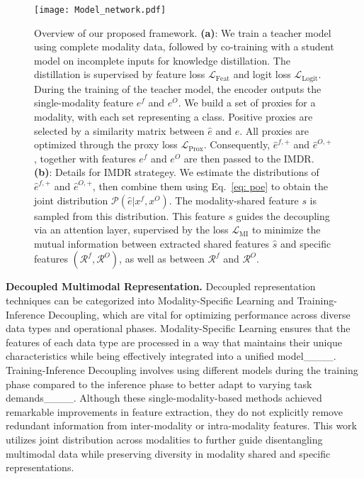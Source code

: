 \begin{figure*}[!ht]
\centering
\normalsize
\texttt{[image: Model\_network.pdf]}
    \caption{Overview of our proposed framework. \textbf{(a)}: 
    We train a teacher model using complete modality data, followed by co-training with a student model on incomplete inputs for knowledge distillation. The distillation is supervised by feature loss $\mathcal{L}_{\text{Feat}}$ and logit loss $\mathcal{L}_{\text{Logit}}$.
    During the training of the teacher model, the encoder outputs the single-modality feature $e^f$ and $e^O$.  We build a set of proxies for a modality, with each set representing a class. Positive proxies are selected by a similarity matrix between $\hat{e}$ and $e$. All proxies are optimized through the proxy loss $\mathcal{L}_{\text{Prox}}$. Consequently, $\hat{e}^{f,+}$ and $\hat{e}^{O,+}$, together with features $e^f$ and $e^O$ are then passed to the IMDR.
    \textbf{(b)}: Details for IMDR strategey. 
    We estimate the distributions of $\hat{e}^{f,+}$ and $\hat{e}^{O,+}$, then combine them using Eq.~\ref{eq: poe} to obtain the joint distribution $\mathcal{P}(\hat{e} \vert  x^{f}, x^{O})$. The modality-shared feature $s$ is sampled from this distribution. This feature $s$ guides the decoupling via an attention layer, supervised by the loss $\mathcal{L}_{\text{MI}}$ to minimize the mutual information between extracted shared features $\hat{s}$ and specific features $(\mathcal{R}^f, \mathcal{R}^O)$, as well as between $\mathcal{R}^f$ and $\mathcal{R}^O$.
    }
    \label{fig:enter-label}
\end{figure*}
\noindent\textbf{Decoupled Multimodal Representation.}
Decoupled representation techniques can be categorized into Modality-Specific Learning and Training-Inference Decoupling, which are vital for optimizing performance across diverse data types and operational phases.
Modality-Specific Learning ensures that the features of each data type are processed in a way that maintains their unique characteristics while being effectively integrated into a unified model____. 
Training-Inference Decoupling involves using different models during the training phase compared to the inference phase to better adapt to varying task demands____. 
Although these single-modality-based methods achieved remarkable improvements in feature extraction, they do not explicitly remove redundant information from inter-modality or intra-modality features.
This work utilizes joint distribution across modalities to further guide disentangling multimodal data while preserving diversity in modality shared and specific representations.